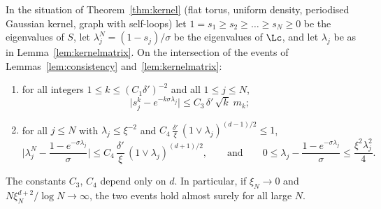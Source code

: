 \begin{theorem}\label{thm:eigtorus}
In the situation of Theorem~\ref{thm:kernel} (flat torus, uniform density, periodised Gaussian kernel, graph with self-loops) let $1=s_1\ge s_2\ge\dots\ge s_N\ge0$ be the eigenvalues of $S$, let $\lambda^N_j=(1-s_j)/\sigma$ be the eigenvalues of $\Lc$, and let $\lambda_j$ be as in Lemma~\ref{lem:kernelmatrix}. On the intersection of the events of Lemmas~\ref{lem:consistency} and~\ref{lem:kernelmatrix}:
\begin{enumerate}[label=\textup{(\roman*)}]
\item for all integers $1\le k\le(C_1\delta')^{-2}$ and all $1\le j\le N$,
\[
\big|s_j^k-e^{-k\sigma\lambda_j}\big|\le C_3\,\delta'\,\sqrt k\;m_k ;
\]
\item for all $j\le N$ with $\lambda_j\le\xi^{-2}$ and $C_4\,\frac{\delta'}{\xi}\,(1\vee\lambda_j)^{(d-1)/2}\le1$,
\[
\Big|\lambda^N_j-\frac{1-e^{-\sigma\lambda_j}}{\sigma}\Big|\le C_4\,\frac{\delta'}{\xi}\,(1\vee\lambda_j)^{(d+1)/2},\qquad\text{and}\qquad0\le\lambda_j-\frac{1-e^{-\sigma\lambda_j}}{\sigma}\le\frac{\xi^2\lambda_j^2}{4}.
\]
\end{enumerate}
The constants $C_3$, $C_4$ depend only on $d$. In particular, if $\xi_N\to0$ and $N\xi_N^{d+2}/\log N\to\infty$, the two events hold almost surely for all large $N$.
\end{theorem}

